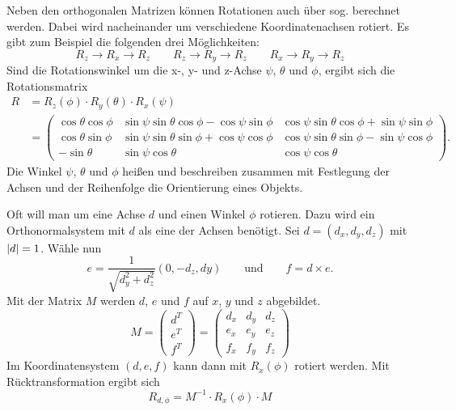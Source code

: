 Neben den orthogonalen Matrizen können Rotationen auch über sog.  berechnet werden.
Dabei wird nacheinander um verschiedene Koordinatenachsen rotiert.
Es gibt zum Beispiel die folgenden drei Möglichkeiten:
\[
  R_z \to R_x \to R_z \qquad
  R_z \to R_y \to R_z \qquad
  R_x \to R_y \to R_z
\]
Sind die Rotationswinkel um die x-, y- und z-Achse $\psi$, $\theta$ und $\phi$, ergibt sich die Rotationsmatrix
\begin{align*}
  R &= R_z(\phi) \cdot R_y(\theta) \cdot R_x(\psi) \\
  &=
  \begin{pmatrix}
    \cos\theta\cos\phi &
    \sin\psi\sin\theta\cos\phi-\cos\psi\sin\phi &
    \cos\psi\sin\theta\cos\phi+\sin\psi\sin\phi \\
    \cos\theta\sin\phi &
    \sin\psi\sin\theta\sin\phi+\cos\psi\cos\phi &
    \cos\psi\sin\theta\sin\phi-\sin\psi\cos\phi \\
    -\sin\theta &
    \sin\psi\cos\theta &
    \cos\psi\cos\theta
  \end{pmatrix}
  \text{.}
\end{align*}
Die Winkel $\psi$, $\theta$ und $\phi$ heißen  und beschreiben zusammen mit Festlegung der Achsen und der Reihenfolge die Orientierung eines Objekts.

Oft will man um eine Achse $d$ und einen Winkel $\phi$ rotieren.
Dazu wird ein Orthonormalsystem mit $d$ als eine der Achsen benötigt.
Sei $d = \left(d_x, d_y, d_z\right)$ mit $\vert d \vert = 1$.
Wähle nun \zB
\[
  e = \frac{1}{\sqrt{d_y^2+ d_z^2}}\left(0, -d_z, dy\right) \qquad \text{und} \qquad
  f = d \times e \text{.}
\]
Mit der Matrix $M$ werden $d$, $e$ und $f$ auf $x$, $y$ und $z$ abgebildet.
\[
  M =
  \begin{pmatrix}
    d^T \\
    e^T \\
    f^T
  \end{pmatrix}
  =
  \begin{pmatrix}
    d_x & d_y & d_z \\
    e_x & e_y & e_z \\
    f_x & f_y & f_z
  \end{pmatrix}
\]
Im Koordinatensystem $(d, e, f)$ kann dann mit $R_x(\phi)$ rotiert werden.
Mit Rücktransformation ergibt sich
\[
  R_{d,\phi} = M^{-1} \cdot R_x(\phi) \cdot M
\]
